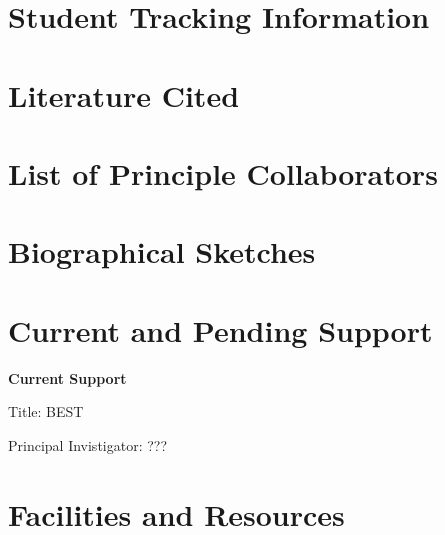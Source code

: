 \documentclass{DOEproposal}
\begin{document}
	
	\section{Student Tracking Information}
        \label{sec:staffing}
        
    \newpage




    \section{Literature Cited}
        \label{sec:references}
        
    \newpage

	\section{List of Principle Collaborators}
        \label{sec:PC}
        
    \newpage

 
	
	\section{Biographical Sketches}
        \label{sec:biosketches}
        
    
	\section{Current and Pending Support}
        \label{sec:grants}
	
	{\bf Current Support}

	\noindent
	Title: BEST
	
	\noindent
	Principal Invistigator: ???  

	\section{Facilities and Resources}
        \label{sec:facres}
	
\end{document}
